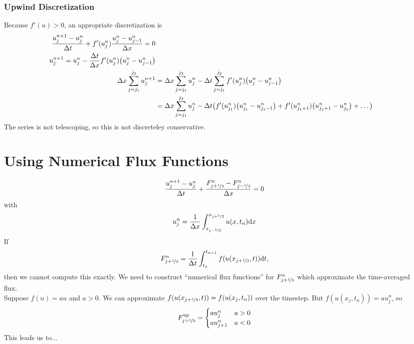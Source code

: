 \documentclass{article}
\newcommand{\half}{\nicefrac{1}{2}}
\newcommand{\Dx}{\Delta x}
\newcommand{\Dt}{\Delta t}
\newcommand{\centdiff}{\frac{u_j^{n+1} - u_j^n}{\Dt}}
\begin{document}
            \subsubsection{Upwind Discretization}
                Because $f'(u) > 0$, an appropriate discretization is
                \begin{align*}
                    \frac{u_j^{n+1} - u_j^n}{\Dt}+ f'(u_j^n)\frac{u_j^n - u_{j-1}^n}{\Dx} = 0 \\
                    u_j^{n+1} = u_j^n - \frac{\Dt}{\Dx}f'(u_j^n)\qty(u_j^n - u_{j-1}^n) \\
                    \Dx\sum_{j=j_1}^{j_2}u_j^{n+1} &= \Dx\sum_{j=j_1}^{j_2}u_j^n - \Dt\sum_{j=j_1}^{j_2}f'(u_j^n)\qty(u_j^n - u_{j-1}^n) \\
                    &= \Dx\sum_{j=j_1}^{j_2}u_j^n - \Dt\qty(f'(u_{j_1}^n)\qty(u_{j_1}^n - u_{j_1-1}^n) + f'(u_{j_1+1}^n)\qty(u_{j_1+1}^n - u_{j_1}^n) + \dots)
                \end{align*}
                The series is not telescoping, so this is not discreteley conservative.

    \section{Using Numerical Flux Functions}
        \begin{align*}
            \centdiff + \frac{F_{j+\half}^n - F_{j-\half}^n}{\Dx} = 0
        \end{align*}
        with
        \begin{align*}
            u_j^n = \frac{1}{\Dx}\int_{x_{j - \half}}^{x_{j+\half}}u(x,t_n)\dd x
        \end{align*}
        If
        \begin{align*}
            F_{j+\half}^n = \frac{1}{\Dt}\int_{t_n}^{t_{n+1}}f(u(x_{j+\half},t))\dd t,
        \end{align*}
        then we cannot compute this exactly.  We need to construct ``numerical flux functions'' for $F_{j+\half}^n$ which approximate the time-averaged flux. \\

        Suppose $f(u) = au$ and $a > 0$.  We can approximate $f(u(x_{j+\half},t)) = f(u(x_j,t_n))$ over the timestep.  But $f(u(x_j,t_n)) = au_j^n$, so
        \begin{align*}
            F_{j+\half}^{\text{up}} = \begin{cases}
                au_j^n & a > 0 \\
                au_{j+1}^n & a < 0
            \end{cases}
        \end{align*}
        This leads us to...
\end{document}
